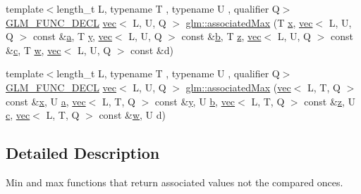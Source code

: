 \begin{DoxyCompactItemize}
\item 
{\footnotesize template$<$length\+\_\+t L, typename T , typename U , qualifier Q$>$ }\\\hyperlink{setup_8hpp_ab2d052de21a70539923e9bcbf6e83a51}{G\+L\+M\+\_\+\+F\+U\+N\+C\+\_\+\+D\+E\+CL} \hyperlink{structglm_1_1vec}{vec}$<$ L, U, Q $>$ \hyperlink{group__gtx__associated__min__max_ga11477c2c4b5b0bfd1b72b29df3725a9d}{glm\+::associated\+Max} (T \hyperlink{_s_d_l__opengl_8h_ad0e63d0edcdbd3d79554076bf309fd47}{x}, \hyperlink{structglm_1_1vec}{vec}$<$ L, U, Q $>$ const \&\hyperlink{_s_d_l__opengl__glext_8h_a3309789fc188587d666cda5ece79cf82}{a}, T \hyperlink{_s_d_l__opengl_8h_a1675d9d7bb68e1657ff028643b4037e3}{y}, \hyperlink{structglm_1_1vec}{vec}$<$ L, U, Q $>$ const \&\hyperlink{_s_d_l__opengl__glext_8h_a0f71581a41fd2264c8944126dabbd010}{b}, T \hyperlink{_s_d_l__opengl__glext_8h_a5e74030ebb3297ce1b37ff716fedd68f}{z}, \hyperlink{structglm_1_1vec}{vec}$<$ L, U, Q $>$ const \&\hyperlink{_s_d_l__opengl__glext_8h_a1f2d7f8147412c43ba2303a56f97ee73}{c}, T \hyperlink{_s_d_l__opengl__glext_8h_a6ee8f168a7ab6785a9bb57c6715dad99}{w}, \hyperlink{structglm_1_1vec}{vec}$<$ L, U, Q $>$ const \&d)
\item 
{\footnotesize template$<$length\+\_\+t L, typename T , typename U , qualifier Q$>$ }\\\hyperlink{setup_8hpp_ab2d052de21a70539923e9bcbf6e83a51}{G\+L\+M\+\_\+\+F\+U\+N\+C\+\_\+\+D\+E\+CL} \hyperlink{structglm_1_1vec}{vec}$<$ L, U, Q $>$ \hyperlink{group__gtx__associated__min__max_gab9c3dd74cac899d2c625b5767ea3b3fb}{glm\+::associated\+Max} (\hyperlink{structglm_1_1vec}{vec}$<$ L, T, Q $>$ const \&\hyperlink{_s_d_l__opengl_8h_ad0e63d0edcdbd3d79554076bf309fd47}{x}, U \hyperlink{_s_d_l__opengl__glext_8h_a3309789fc188587d666cda5ece79cf82}{a}, \hyperlink{structglm_1_1vec}{vec}$<$ L, T, Q $>$ const \&\hyperlink{_s_d_l__opengl_8h_a1675d9d7bb68e1657ff028643b4037e3}{y}, U \hyperlink{_s_d_l__opengl__glext_8h_a0f71581a41fd2264c8944126dabbd010}{b}, \hyperlink{structglm_1_1vec}{vec}$<$ L, T, Q $>$ const \&\hyperlink{_s_d_l__opengl__glext_8h_a5e74030ebb3297ce1b37ff716fedd68f}{z}, U \hyperlink{_s_d_l__opengl__glext_8h_a1f2d7f8147412c43ba2303a56f97ee73}{c}, \hyperlink{structglm_1_1vec}{vec}$<$ L, T, Q $>$ const \&\hyperlink{_s_d_l__opengl__glext_8h_a6ee8f168a7ab6785a9bb57c6715dad99}{w}, U d)
\end{DoxyCompactItemize}


\subsection{Detailed Description}
Min and max functions that return associated values not the compared onces. 

